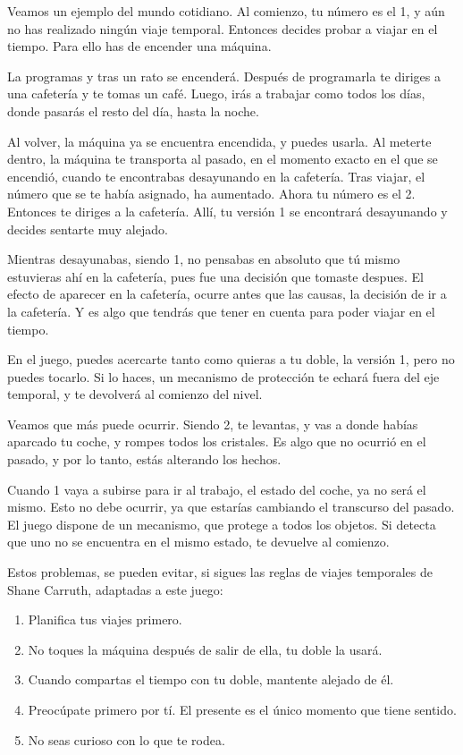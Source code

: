 \documentclass[11pt,a4paper]{article}
\begin{document}
Veamos un ejemplo del mundo cotidiano. Al comienzo, tu número es el 1, y aún no 
has realizado ningún viaje temporal. Entonces decides probar a viajar en el 
tiempo. Para ello has de encender una máquina.

La programas y tras un rato se encenderá. Después de programarla te diriges a 
una cafetería y te tomas un café. Luego, irás a trabajar como todos los días, 
donde pasarás el resto del día, hasta la noche.

Al volver, la máquina ya se encuentra encendida, y puedes usarla. Al meterte 
dentro, la máquina te transporta al pasado, en el momento exacto en el que se 
encendió, cuando te encontrabas desayunando en la cafetería. Tras viajar, el 
número que se te había asignado, ha aumentado. Ahora tu número es el 2.  
Entonces te diriges a la cafetería. Allí, tu versión 1 se encontrará desayunando 
y decides sentarte muy alejado.

Mientras desayunabas, siendo 1, no pensabas en absoluto que tú mismo estuvieras 
ahí en la cafetería, pues fue una decisión que tomaste despues. El efecto de 
aparecer en la cafetería, ocurre antes que las causas, la decisión de ir a la 
cafetería. Y es algo que tendrás que tener en cuenta para poder viajar en el 
tiempo.

En el juego, puedes acercarte tanto como quieras a tu doble, la versión 1, pero 
no puedes tocarlo. Si lo haces, un mecanismo de protección te echará fuera del 
eje temporal, y te devolverá al comienzo del nivel.

Veamos que más puede ocurrir. Siendo 2, te levantas, y vas a donde habías 
aparcado tu coche, y rompes todos los cristales. Es algo que no ocurrió en el 
pasado, y por lo tanto, estás alterando los hechos.

Cuando 1 vaya a subirse para ir al trabajo, el estado del coche, ya no será el 
mismo. Esto no debe ocurrir, ya que estarías cambiando el transcurso del pasado.  
El juego dispone de un mecanismo, que protege a todos los objetos. Si detecta 
que uno no se encuentra en el mismo estado, te devuelve al comienzo.

Estos problemas, se pueden evitar, si sigues las reglas de viajes temporales de 
Shane Carruth, adaptadas a este juego:

\begin{enumerate}
\item Planifica tus viajes primero.
\item No toques la máquina después de salir de ella, tu doble la usará.
\item Cuando compartas el tiempo con tu doble, mantente alejado de él.
\item Preocúpate primero por tí. El presente es el único momento que tiene 
sentido.
\item No seas curioso con lo que te rodea.
\end{enumerate}
\end{document}
